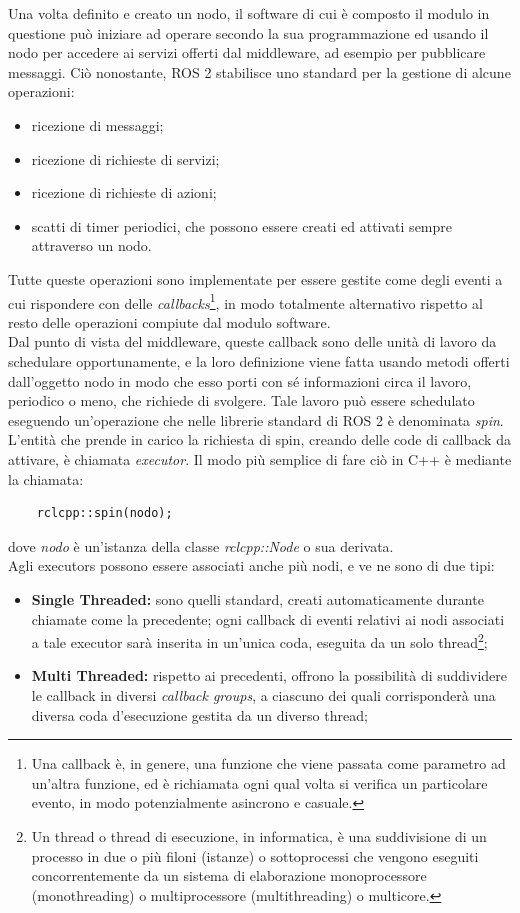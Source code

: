 \indent Una volta definito e creato un nodo, il software di cui è composto il modulo in questione può iniziare ad operare secondo la sua programmazione ed usando il nodo per accedere ai servizi offerti dal middleware, ad esempio per pubblicare messaggi. Ciò nonostante, ROS 2 stabilisce uno standard per la gestione di alcune operazioni:
\begin{itemize}
    \item ricezione di messaggi;
    \item ricezione di richieste di servizi;
    \item ricezione di richieste di azioni;
    \item scatti di timer periodici, che possono essere creati ed attivati sempre attraverso un nodo.
\end{itemize}
Tutte queste operazioni sono implementate per essere gestite come degli eventi a cui rispondere con delle \emph{callbacks}\footnote{Una callback è, in genere, una funzione che viene passata come parametro ad un'altra funzione, ed è richiamata ogni qual volta si verifica un particolare evento, in modo potenzialmente asincrono e casuale.}, in modo totalmente alternativo rispetto al resto delle operazioni compiute dal modulo software.\\
Dal punto di vista del middleware, queste callback sono delle unità di lavoro da schedulare opportunamente, e la loro definizione viene fatta usando metodi offerti dall'oggetto nodo in modo che esso porti con sé informazioni circa il lavoro, periodico o meno, che richiede di svolgere. Tale lavoro può essere schedulato eseguendo un'operazione che nelle librerie standard di ROS 2 è denominata \emph{spin}. L'entità che prende in carico la richiesta di spin, creando delle code di callback da attivare, è chiamata \emph{executor}. Il modo più semplice di fare ciò in C++ è mediante la chiamata:
\begin{verbatim}
    rclcpp::spin(nodo);
\end{verbatim}
dove \emph{nodo} è un'istanza della classe \emph{rclcpp::Node} o sua derivata.\\
Agli executors possono essere associati anche più nodi, e ve ne sono di due tipi:
\vfill
\begin{itemize}
    \item \textbf{Single Threaded:} sono quelli standard, creati automaticamente durante chiamate come la precedente; ogni callback di eventi relativi ai nodi associati a tale executor sarà inserita in un'unica coda, eseguita da un solo thread\footnote{Un thread o thread di esecuzione, in informatica, è una suddivisione di un processo in due o più filoni (istanze) o sottoprocessi che vengono eseguiti concorrentemente da un sistema di elaborazione monoprocessore (monothreading) o multiprocessore (multithreading) o multicore.};
    \item \textbf{Multi Threaded:} rispetto ai precedenti, offrono la possibilità di suddividere le callback in diversi \emph{callback groups}, a ciascuno dei quali corrisponderà una diversa coda d'esecuzione gestita da un diverso thread;
\end{itemize}
